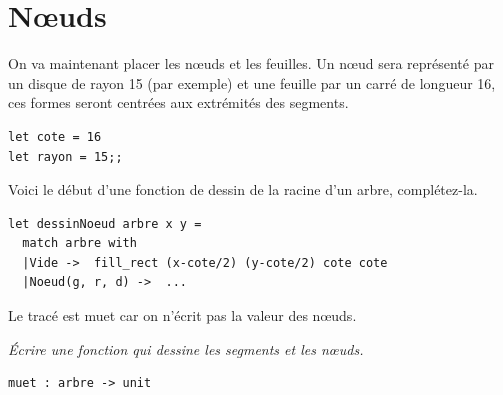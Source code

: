 \section{Nœuds}
\begin{minipage}{0.5\textwidth}
On va maintenant placer les nœuds et les feuilles. Un nœud sera représenté par un disque de rayon 15 (par exemple) et une feuille par un carré de longueur 16, ces formes seront centrées aux extrémités des segments.
\begin{lstlisting}
let cote = 16
let rayon = 15;;
\end{lstlisting}

Voici le début d'une fonction de dessin de la racine d'un arbre, complétez-la.
\begin{lstlisting}
let dessinNoeud arbre x y =
  match arbre with
  |Vide ->  fill_rect (x-cote/2) (y-cote/2) cote cote
  |Noeud(g, r, d) ->  ...
\end{lstlisting}
Le tracé est muet car on n'écrit pas la valeur des nœuds.
\begin{Exercise}\it 
Écrire une fonction  qui dessine les segments et les nœuds.
\end{Exercise}
\begin{lstlisting}
muet : arbre -> unit
\end{lstlisting}
\end{minipage}
\begin{minipage}{0.5\textwidth}
\begin{center}
\end{center}
\end{minipage}
